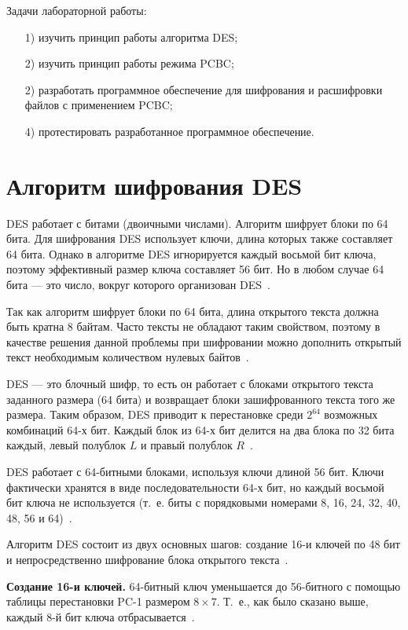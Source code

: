 \documentclass{bmstu}
\begin{document}
Задачи лабораторной работы:
\begin{enumerate}
\item[1)] изучить принцип работы алгоритма DES;
\item[2)] изучить принцип работы режима PCBC;
\item[2)] разработать программное обеспечение для шифрования и расшифровки файлов с применением PCBC;
\item[4)] протестировать разработанное программное обеспечение.
\end{enumerate}

\chapter{Алгоритм шифрования DES}

DES работает с битами (двоичными числами). 
Алгоритм шифрует блоки по 64 бита. 
Для шифрования DES использует ключи, длина которых также составляет 64 бита. 
Однако в алгоритме DES игнорируется каждый восьмой бит ключа, поэтому эффективный размер ключа составляет 56 бит. 
Но в любом случае 64 бита --- это число, вокруг которого организован DES~\cite{grabbe}.

Так как алгоритм шифрует блоки по 64 бита, длина открытого текста должна быть кратна 8 байтам. 
Часто тексты не обладают таким свойством, поэтому в качестве решения данной проблемы при шифровании можно дополнить открытый текст необходимым количеством нулевых байтов~\cite{grabbe}.

DES --- это блочный шифр, то есть он работает с блоками открытого текста заданного размера (64 бита) и возвращает блоки зашифрованного текста того же размера. 
Таким образом, DES приводит к перестановке среди $2^{64}$ возможных комбинаций 64-х бит. 
Каждый блок из 64-х бит делится на два блока по 32 бита каждый, левый полублок $L$ и правый полублок $R$~\cite{grabbe}.

DES работает с 64-битными блоками, используя ключи длиной 56 бит. 
Ключи фактически хранятся в виде последовательности 64-х бит, но каждый восьмой бит ключа не используется (т.~е. биты с порядковыми номерами 8, 16, 24, 32, 40, 48, 56 и 64)~\cite{grabbe}.

Алгоритм DES состоит из двух основных шагов: создание 16-и ключей по 48 бит и непросредственно шифрование блока открытого текста~\cite{grabbe}.

\textbf{Создание 16-и ключей.} 
64-битный ключ уменьшается до 56-битного с помощью таблицы перестановки PC-1 размером $8 \times 7$. 
Т.~е., как было сказано выше, каждый 8-й бит ключа отбрасывается~\cite{grabbe}.
\end{document}
